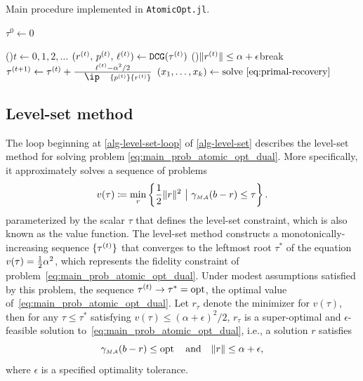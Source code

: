 \begin{algorithm}[t]
  \DontPrintSemicolon
  \caption{Main procedure implemented in \texttt{AtomicOpt.jl}.\label{alg-level-set}}
  \smallskip
  $\tau^{0} \gets 0$
 
  \For(){$t\gets0,1,2,\ldots$}{
    $(r^{(t)},\, p^{(t)},\, \ell^{(t)})\leftarrow\texttt{DCG}(\tau^{(t)})$ 
    \lIf(){$\|r^{(t)}\| \leq \alpha + \epsilon$}{break}
    $\tau\tp1 \gets \tau\t + \frac{\ell\t-\alpha^2/2}{\ip{p\t}{r\t}}$
  }
   $(x_1,\ldots,x_k) \gets \mbox{solve~\eqref{eq:primal-recovery}}$ 
 \end{algorithm}


\subsection{Level-set method} \label{sec:level}
The loop beginning at \autoref{alg-level-set-loop}  of \autoref{alg-level-set} describes the level-set method \cite{BergFriedlander:2008,berg2011sparse,aravkin2016levelset} for solving problem \eqref{eq:main_prob_atomic_opt_dual}. More specifically, it approximately solves a sequence of problems
\begin{equation} \label{eq:value-fn}
  v(\tau) \coloneqq \min_{r}\left\{\frac{1}{2}\|r\|^2 ~\big\vert~ \gamma_{\scriptscriptstyle{M\mathcal{A}}}(b-r) \leq \tau\right\}. 
\end{equation} 
parameterized by the scalar $\tau$ that defines the level-set constraint, which is also known as the value function. The level-set method constructs a monotonically-increasing sequence $\{\tau^{(t)}\}$ that converges to the leftmost root $\tau^*$ of the equation $v(\tau) = {\textstyle{\frac{1}{2}}}\alpha^2$,
which represents the fidelity constraint of problem~\eqref{eq:main_prob_atomic_opt_dual}. Under modest assumptions satisfied by this problem, the sequence $\tau^{(t)}\to\tau^*=\operatorname{opt}$, the optimal value of~\eqref{eq:main_prob_atomic_opt_dual}. Let $r_{\tau}$ denote the minimizer for $v(\tau)$, then for any $\tau \leq \tau^*$ satisfying $v(\tau) \leq (\alpha+\epsilon)^2/2$, $r_\tau$ is a super-optimal and $\epsilon$-feasible solution to~\eqref{eq:main_prob_atomic_opt_dual}, i.e., a solution $r$ satisfies 
\begin{equation} \label{eq:super-optimal}
  \gamma_{\scriptscriptstyle{M\mathcal{A}}}(b-r) \leq \operatorname{opt} \hbox{\quad and\quad} \|r\| \leq \alpha + \epsilon,
\end{equation}
where $\epsilon$ is a specified optimality tolerance. 

